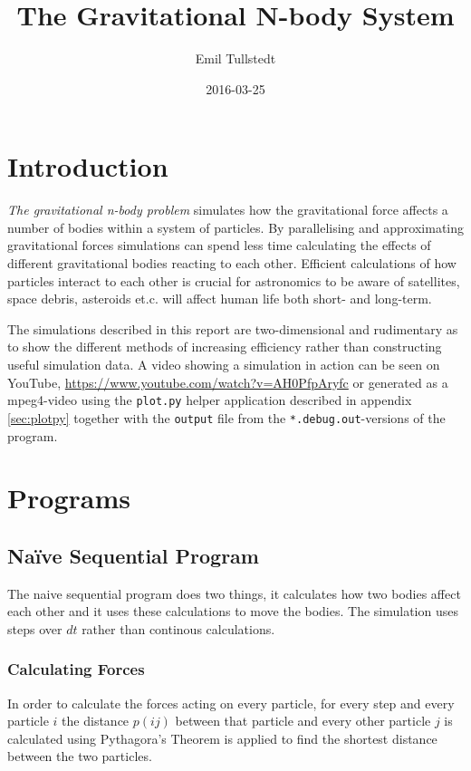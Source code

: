 \documentclass[titlepage,a4paper,12pt]{article}
\title{The Gravitational N-body System}
\author{Emil Tullstedt}
\date{2016-03-25}
\begin{document}
\maketitle

\tableofcontents

\newpage
\section{Introduction}
\textit{The gravitational n-body problem} simulates how the gravitational force
affects a number of bodies within a system of particles. By parallelising and
approximating gravitational forces simulations can spend less time calculating
the effects of different gravitational bodies reacting to each other. Efficient
calculations of how particles interact to each other is crucial for astronomics
to be aware of satellites, space debris, asteroids et.c. will affect human life
both short- and long-term.

The simulations described in this report are two-dimensional and rudimentary as
to show the different methods of increasing efficiency rather than constructing
useful simulation data. A video showing a simulation in action can be seen on
YouTube, \url{https://www.youtube.com/watch?v=AH0PfpAryfc} or generated as a
mpeg4-video using the \texttt{plot.py} helper application described in appendix
\ref{sec:plotpy} together with the \texttt{output} file from the 
\texttt{*.debug.out}-versions of the program.

\section{Programs}
\subsection{Na\"{i}ve Sequential Program}
\label{subsec:seq_sq}

The naive sequential program does two things, it calculates how two bodies
affect each other and it uses these calculations to move the bodies. The
simulation uses steps over $dt$ rather than continous calculations.

\subsubsection{Calculating Forces}
\label{subsubsec:calculatingforces}
In order to calculate the forces acting on every particle, for every step
and every particle $i$ the distance $p(ij)$ between that particle and every
other particle $j$ is calculated using Pythagora's Theorem is applied to find
the shortest distance between the two particles.
\end{document}

